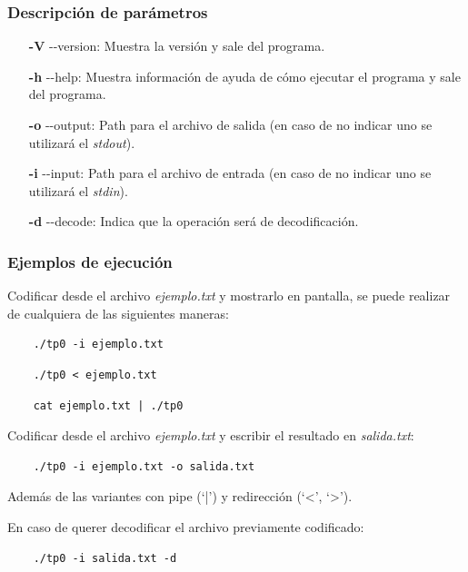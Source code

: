 \documentclass[titlepage,a4paper]{article}
\begin{document}
\subsubsection{Descripción de parámetros}
\begin{itemize}
   \item[\textbf{-V}] {-}{-}version: Muestra la versión y sale del programa.
    \item[\textbf{-h}] {-}{-}help: Muestra información de ayuda de cómo ejecutar el programa y sale del programa.
    \item[\textbf{-o}] {-}{-}output: Path para el archivo de salida (en caso de no indicar uno se utilizará el \textit{stdout}).
    \item[\textbf{-i}] {-}{-}input: Path para el archivo de entrada (en caso de no indicar uno se utilizará el \textit{stdin}).
    \item[\textbf{-d}] {-}{-}decode:  Indica que la operación será de decodificación.
\end{itemize}

\subsubsection{Ejemplos de ejecución}

Codificar desde el archivo \textit{ejemplo.txt} y mostrarlo en pantalla, se puede realizar de cualquiera de las siguientes maneras:

\begin{verbatim}
    ./tp0 -i ejemplo.txt
\end{verbatim}

\begin{verbatim}
    ./tp0 < ejemplo.txt
\end{verbatim}

\begin{verbatim}
    cat ejemplo.txt | ./tp0
\end{verbatim}

Codificar desde  el archivo \textit{ejemplo.txt} y escribir el resultado en \textit{salida.txt}:

\begin{verbatim}
    ./tp0 -i ejemplo.txt -o salida.txt
\end{verbatim}

Además de las variantes con pipe (`|') y redirección (`<', `>').

En caso de querer decodificar el archivo previamente codificado:
\begin{verbatim}
    ./tp0 -i salida.txt -d
\end{verbatim}
\end{document}
